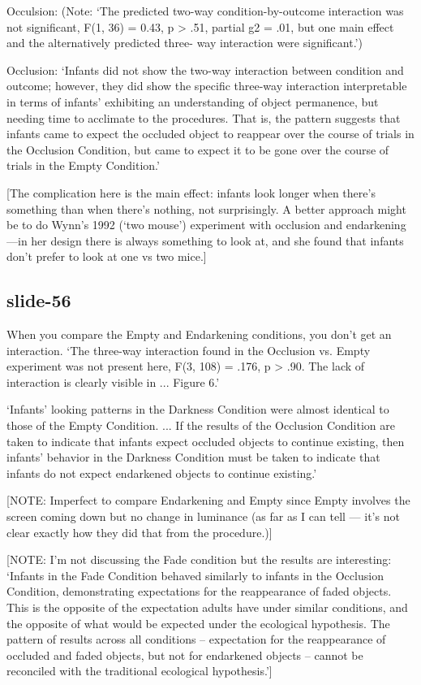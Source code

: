 \documentclass[12pt,\papersize]{extarticle}
\begin{document}
Occulsion:  (Note: ‘The predicted two-way condition-by-outcome interaction was not
significant, F(1, 36) = 0.43, p > .51, partial g2 = .01, but one main
effect and the alternatively predicted three- way interaction were
significant.’)

Occlusion: ‘Infants did not show the two-way interaction between condition
and outcome; however, they did show the specific three-way interaction
interpretable in terms of infants’ exhibiting an understanding of object
permanence, but needing time to acclimate to the procedures. That is, the
pattern suggests that infants came to expect the occluded object to
reappear over the course of trials in the Occlusion Condition, but came to
expect it to be gone over the course of trials in the Empty Condition.’

[The complication here is the main effect: infants look longer when there’s
something than when there’s nothing, not surprisingly.
A better approach might be to do Wynn’s 1992 (‘two mouse’) experiment with
occlusion and endarkening---in her design there is always something to look at,
and she found that infants don’t prefer to look at one vs two mice.]

\subsection{slide-56}
When you compare the Empty and Endarkening conditions, you don’t get an interaction.
‘The three-way interaction found in the Occlusion vs. Empty experiment
was not present here, F(3, 108) = .176, p > .90. The lack of interaction
is clearly visible in ... Figure 6.’

‘Infants’ looking patterns in the Darkness Condition were almost
identical to those of the Empty Condition. ...
If the results of the Occlusion Condition are taken to indicate that
infants expect occluded objects to continue existing, then infants’
behavior in the Darkness Condition must be taken to indicate that infants
do not expect endarkened objects to continue existing.’

[NOTE: Imperfect to compare Endarkening and Empty since Empty involves the
screen coming down but no change in luminance (as far as I can tell --- it’s
not clear exactly how they did that from the procedure.)]

[NOTE: I’m not discussing the Fade condition but the results are interesting:
‘Infants in the Fade Condition behaved similarly to infants in the
Occlusion Condition, demonstrating expectations for the reappearance of
faded objects. This is the opposite of the expectation adults have under
similar conditions, and the opposite of what would be expected under the
ecological hypothesis. The pattern of results across all conditions –
expectation for the reappearance of occluded and faded objects, but not
for endarkened objects – cannot be reconciled with the traditional
ecological hypothesis.’]
\end{document}
